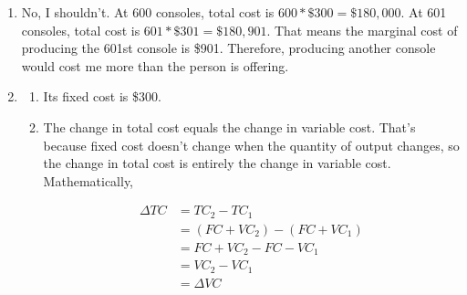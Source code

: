 \documentclass{article}
\begin{document}
\begin{enumerate}
\begin{enumerate}
	\item Marginal product increases at first and decreases later. Marginal cost decreases at first and increases later. The trend in marginal product explains the trend in marginal cost. Since workers get increasingly productive at first, it requires less additional labor to produce an additional unit of output. Less additional labor means lower marginal costs. When workers get less productive, it requires more additional labor to produce an additional unit of output. Hiring more additional labor means higher marginal costs.
	
	\item When marginal cost is lower than average total cost, average total cost is decreasing because producing additional units at lower than average cost pulls the average down. When marginal cost is higher than average total cost, average total cost is increasing because producing additional units at higher than average cost pulls the average up. Marginal cost intersects average total cost at average total cost's minimum because that's where average total cost switches from decreasing to increasing.
	
	\end{enumerate}
	
\item No, I shouldn't. At 600 consoles, total cost is $600 * \$300 = \$180,000$. At 601 consoles, total cost is $601 * \$301 = \$180,901$. That means the marginal cost of producing the 601st console is \$901. Therefore, producing another console would cost me more than the person is offering. 

\item

	\begin{enumerate}
	
	\item Its fixed cost is \$300.
	
	\item The change in total cost equals the change in variable cost. That's because fixed cost doesn't change when the quantity of output changes, so the change in total cost is entirely the change in variable cost. Mathematically,
	
	\begin{align*}
	\Delta TC &= TC_2 - TC_1 \\
	&= (FC + VC_2) - (FC + VC_1) \\
	&= FC + VC_2 - FC - VC_1 \\
	&= VC_2 - VC_1 \\
	&= \Delta VC
	\end{align*}
	

\end{enumerate}
\end{enumerate}
\end{document}
